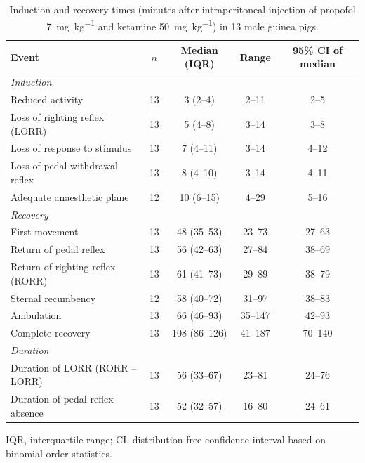 \begin{table}[p]
\centering
\caption{Induction and recovery times (minutes after intraperitoneal injection of propofol \SI{7}{\milli\gram\per\kilo\gram} and ketamine \SI{50}{\milli\gram\per\kilo\gram}) in 13 male guinea pigs.}
\label{tab:times}
\small
\begin{tabular}{lcccc}
\toprule
Event & $n$ & Median (IQR) & Range & 95\% CI of median \\
\midrule
\multicolumn{5}{l}{\textit{Induction}} \\
\quad Reduced activity & 13 & 3 (2--4) & 2--11 & 2--5 \\
\quad Loss of righting reflex (LORR) & 13 & 5 (4--8) & 3--14 & 3--8 \\
\quad Loss of response to stimulus & 13 & 7 (4--11) & 3--14 & 4--12 \\
\quad Loss of pedal withdrawal reflex & 13 & 8 (4--10) & 3--14 & 4--11 \\
\quad Adequate anaesthetic plane & 12 & 10 (6--15) & 4--29 & 5--16 \\
\multicolumn{5}{l}{\textit{Recovery}} \\
\quad First movement & 13 & 48 (35--53) & 23--73 & 27--63 \\
\quad Return of pedal reflex & 13 & 56 (42--63) & 27--84 & 38--69 \\
\quad Return of righting reflex (RORR) & 13 & 61 (41--73) & 29--89 & 38--79 \\
\quad Sternal recumbency & 12 & 58 (40--72) & 31--97 & 38--83 \\
\quad Ambulation & 13 & 66 (46--93) & 35--147 & 42--93 \\
\quad Complete recovery & 13 & 108 (86--126) & 41--187 & 70--140 \\
\multicolumn{5}{l}{\textit{Duration}} \\
\quad Duration of LORR (RORR -- LORR) & 13 & 56 (33--67) & 23--81 & 24--76 \\
\quad Duration of pedal reflex absence & 13 & 52 (32--57) & 16--80 & 24--61 \\
\bottomrule
\end{tabular}
\par\smallskip\footnotesize IQR, interquartile range; CI, distribution-free confidence interval based on binomial order statistics.
\end{table}

